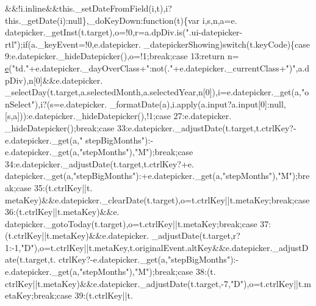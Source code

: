 \begin{DoxyCode}
      &&!i.inline&&this.\_setDateFromField(i,t),i?this.\_getDate(i):null\},\_doKeyDown:function(t)\{var i,s,n,a=e.
      datepicker.\_getInst(t.target),o=!0,r=a.dpDiv.is(\textcolor{stringliteral}{".ui-datepicker-rtl"});\textcolor{keywordflow}{if}(a.\_keyEvent=!0,e.datepicker.
      \_datepickerShowing)\textcolor{keywordflow}{switch}(t.keyCode)\{\textcolor{keywordflow}{case} 9:e.datepicker.\_hideDatepicker(),o=!1;\textcolor{keywordflow}{break};\textcolor{keywordflow}{case} 13:\textcolor{keywordflow}{return} n=
      \hyperlink{jquery-ui_8min_8js_a2c038346d47955cbe2cb91e338edd7e1}{e}(\textcolor{stringliteral}{"td."}+e.datepicker.\_dayOverClass+\textcolor{stringliteral}{":not(."}+e.datepicker.\_currentClass+\textcolor{stringliteral}{")"},a.dpDiv),n[0]&&e.datepicker.
      \_selectDay(t.target,a.selectedMonth,a.selectedYear,n[0]),i=e.datepicker.\_get(a,\textcolor{stringliteral}{"onSelect"}),i?(s=e.datepicker.
      \_formatDate(a),i.apply(a.input?a.input[0]:null,[s,a])):e.datepicker.\_hideDatepicker(),!1;\textcolor{keywordflow}{case} 27:e.datepicker.
      \_hideDatepicker();\textcolor{keywordflow}{break};\textcolor{keywordflow}{case} 33:e.datepicker.\_adjustDate(t.target,t.ctrlKey?-e.datepicker.\_get(a,\textcolor{stringliteral}{"
      stepBigMonths"}):-e.datepicker.\_get(a,\textcolor{stringliteral}{"stepMonths"}),\textcolor{stringliteral}{"M"});\textcolor{keywordflow}{break};\textcolor{keywordflow}{case} 34:e.datepicker.\_adjustDate(t.target,t.ctrlKey?+e.
      datepicker.\_get(a,\textcolor{stringliteral}{"stepBigMonths"}):+e.datepicker.\_get(a,\textcolor{stringliteral}{"stepMonths"}),\textcolor{stringliteral}{"M"});\textcolor{keywordflow}{break};\textcolor{keywordflow}{case} 35:(t.ctrlKey||t.
      metaKey)&&e.datepicker.\_clearDate(t.target),o=t.ctrlKey||t.metaKey;\textcolor{keywordflow}{break};\textcolor{keywordflow}{case} 36:(t.ctrlKey||t.metaKey)&&e.
      datepicker.\_gotoToday(t.target),o=t.ctrlKey||t.metaKey;\textcolor{keywordflow}{break};\textcolor{keywordflow}{case} 37:(t.ctrlKey||t.metaKey)&&e.datepicker.
      \_adjustDate(t.target,r?1:-1,\textcolor{stringliteral}{"D"}),o=t.ctrlKey||t.metaKey,t.originalEvent.altKey&&e.datepicker.\_adjustDate(t.target,t.
      ctrlKey?-e.datepicker.\_get(a,\textcolor{stringliteral}{"stepBigMonths"}):-e.datepicker.\_get(a,\textcolor{stringliteral}{"stepMonths"}),\textcolor{stringliteral}{"M"});\textcolor{keywordflow}{break};\textcolor{keywordflow}{case} 38:(t.
      ctrlKey||t.metaKey)&&e.datepicker.\_adjustDate(t.target,-7,\textcolor{stringliteral}{"D"}),o=t.ctrlKey||t.metaKey;\textcolor{keywordflow}{break};\textcolor{keywordflow}{case} 39:(t.ctrlKey||t.

\end{DoxyCode}
